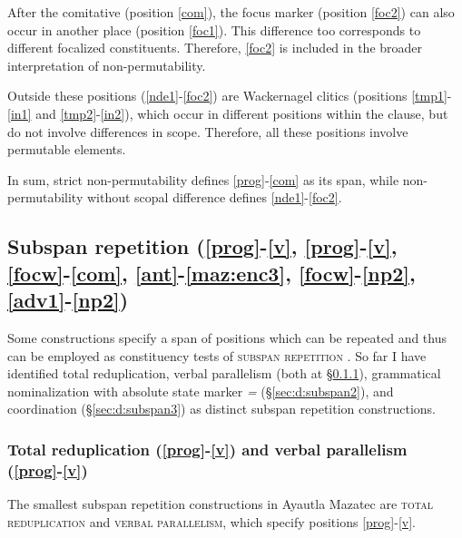 \documentclass[output=paper]{langscibook}
\begin{document}
After the comitative (position \ref{com}), the focus marker (position \ref{foc2}) can also occur in another place (position \ref{foc1}). This difference too corresponds to different focalized constituents. Therefore, \ref{foc2} is included in the broader interpretation of non-permutability.

Outside these positions (\ref{nde1}-\ref{foc2}) are Wackernagel clitics (positions \ref{tmp1}-\ref{in1} and \ref{tmp2}-\ref{in2}), which occur in different positions within the clause, but do not involve differences in scope. Therefore, all these positions involve permutable elements.

In sum, strict non-permutability defines \ref{prog}-\ref{com} as its span, while non-permuta\-bil\-ity without scopal difference defines \ref{nde1}-\ref{foc2}.

\subsection{Subspan repetition (\ref{prog}-\ref{v}, \ref{prog}-\ref{v}, \ref{focw}-\ref{com}, \ref{ant}-\ref{maz:enc3}, \ref{focw}-\ref{np2}, \ref{adv1}-\ref{np2})}\label{sec:d:subspan}
Some constructions specify a span of positions which can be repeated and thus can be employed as constituency tests of \textsc{subspan repetition} \citep[cf.][]{tallman2021constituency}. So far I have identified total reduplication, verbal parallelism (both at \S\ref{sec:d:subspan1}), grammatical nominalization with absolute state marker \textit{=\1} (\S\ref{sec:d:subspan2}), and coordination (\S\ref{sec:d:subspan3}) as distinct subspan repetition constructions.






\subsubsection{Total reduplication (\ref{prog}-\ref{v}) and verbal parallelism (\ref{prog}-\ref{v})}\label{sec:d:subspan1} 
The smallest subspan repetition constructions in Ayautla Mazatec are  \textsc{total reduplication} and \textsc{verbal parallelism}, which specify positions \ref{prog}-\ref{v}.
\end{document}
